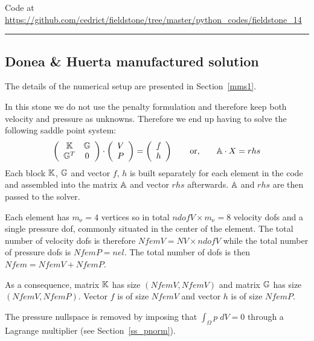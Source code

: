 

\begin{center}
Code at \url{https://github.com/cedrict/fieldstone/tree/master/python_codes/fieldstone_14}
\end{center}

\par\noindent\rule{\textwidth}{0.4pt}

\subsection*{Donea \& Huerta manufactured solution}

The details of the numerical setup are presented in Section~\ref{mms1}.

In this stone we do not use the penalty formulation and therefore 
keep both velocity and pressure as unknowns. Therefore we end up having to solve 
the following saddle point system:
\[
\left(
\begin{array}{cc}
{\mathbb{K}} & {\mathbb{G}} \\ {\mathbb{G}}^T & 0 
\end{array}
\right)
\cdot
\left(
\begin{array}{c}
V \\ P
\end{array}
\right)
=
\left(
\begin{array}{c}
 f \\ h
\end{array}
\right)
\quad\quad
{\rm or,}
\quad\quad
{\mathbb{A}} \cdot X = rhs
\]
Each block ${\mathbb{K}}$, ${\mathbb{G}}$ and vector $f$, $h$ is built separately for each element 
in the code and assembled into 
the matrix ${\mathbb{A}}$ and vector $rhs$ afterwards. ${\mathbb{A}}$ and $rhs$ are then passed to the solver. 

Each element has $m_\upnu=4$ vertices so in total $ndofV\times m_\upnu=8$ 
velocity dofs and a single 
pressure dof, commonly situated in the center of the element. The total number of 
velocity dofs is therefore $NfemV=NV \times ndofV$ while the total number of
pressure dofs is $NfemP=nel$. The total number of dofs is then $Nfem=NfemV+NfemP$.

As a consequence, matrix ${\mathbb{K}}$ has size $(NfemV,NfemV)$ and matrix ${\mathbb{G}}$ has size $(NfemV,NfemP)$.
Vector $f$ is of size $NfemV$ and vector $h$ is of size $NfemP$.  

The pressure nullspace is removed by imposing that $\int_\Omega p \; dV =0$ through 
a Lagrange multiplier (see Section~\ref{ss_pnorm}).

